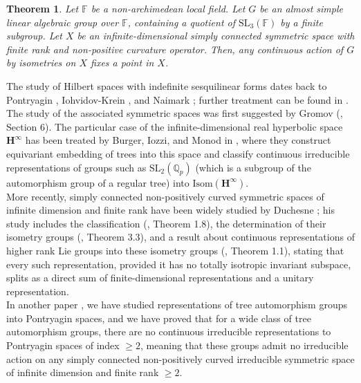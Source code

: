 \documentclass{article}
\theoremstyle{definition}
\theoremstyle{remark}
\theoremstyle{plain}
\newtheorem{thm}[dfn]{Theorem}
\begin{document}
\begin{thm} \label{Main2}
    Let $\mathbb{F}$ be a non-archimedean local field. Let $G$ be an almost simple linear algebraic group over $\mathbb{F}$, containing a quotient of $\mathrm{SL}_3(\mathbb{F})$ by a finite subgroup. Let $X$ be an infinite-dimensional simply connected symmetric space with finite rank and non-positive curvature operator. Then, any continuous action of $G$ by isometries on $X$ fixes a point in $X$. \\
\end{thm}

The study of Hilbert spaces with indefinite sesquilinear forms dates back to Pontryagin \cite{pontryagin}, Iohvidov-Krein \cite{iohkrein}, and Naimark \cite{naimark1,naimark2,naimark3,naimark4}; further treatment can be found in \cite{aziioh,bognar,iohkrlan}. The study of the associated symmetric spaces was first suggested by Gromov (\cite{gromov}, Section 6). The particular case of the infinite-dimensional real hyperbolic space $\mathbf{H}^\infty$ has been treated by Burger, Iozzi, and Monod in \cite{bim}, where they construct equivariant embedding of trees into this space and classify continuous irreducible representations of groups such as $\mathrm{SL}_2(\mathbb{Q}_p)$ (which is a subgroup of the automorphism group of a regular tree) into $\mathrm{Isom}(\mathbf{H}^\infty)$. \\

More recently, simply connected non-positively curved symmetric spaces of infinite dimension and finite rank have been widely studied by Duchesne \cite{ducphd,duc2013,duc2015,duc2023}; his study includes the classification (\cite{duc2015}, Theorem 1.8), the determination of their isometry groups (\cite{duc2023}, Theorem 3.3), and a result about continuous representations of higher rank Lie groups into these isometry groups (\cite{duc2023}, Theorem 1.1), stating that every such representation, provided it has no totally isotropic invariant subspace, splits as a direct sum of finite-dimensional representations and a unitary representation. \\

In another paper \cite{trees}, we have studied representations of tree automorphism groups into Pontryagin spaces, and we have proved that for a wide class of tree automorphism groups, there are no continuous irreducible representations to Pontryagin spaces of index $\geq 2$, meaning that these groups admit no irreducible action on any simply connected non-positively curved irreducible symmetric space of infinite dimension and finite rank $\geq 2$. \\
\end{document}

